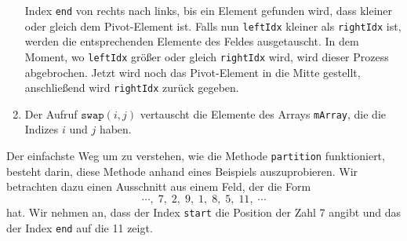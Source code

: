 \begin{enumerate}
      Index \texttt{end} von rechts nach links, bis ein Element gefunden wird, dass kleiner
      oder gleich dem Pivot-Element ist. Falls nun \texttt{leftIdx} kleiner als
      \texttt{rightIdx} ist, werden die entsprechenden Elemente des Feldes ausgetauscht.  In
      dem Moment, wo \texttt{leftIdx} gr\"o{\ss}er oder gleich \texttt{rightIdx} wird, wird dieser
      Prozess abgebrochen. Jetzt wird noch das Pivot-Element in die Mitte gestellt,
      anschlie{\ss}end wird \texttt{rightIdx} zur\"uck gegeben.
\item Der Aufruf $\texttt{swap}(i, j)$ vertauscht die Elemente des Arrays \texttt{mArray},
      die die Indizes $i$ und $j$ haben.  
\end{enumerate}
Der einfachste Weg um zu verstehen, wie die Methode \texttt{partition} funktioniert,
besteht darin, diese Methode anhand eines Beispiels auszuprobieren.  Wir betrachten dazu 
einen Ausschnitt aus einem Feld, der die Form 
\[ \cdots,\; 7,\; 2,\; 9,\; 1,\; 8,\; 5,\; 11,\;\cdots \]
hat.  Wir nehmen an, dass der Index \texttt{start} die Position der Zahl 7 angibt und das
der Index \texttt{end} auf die 11 zeigt.  
